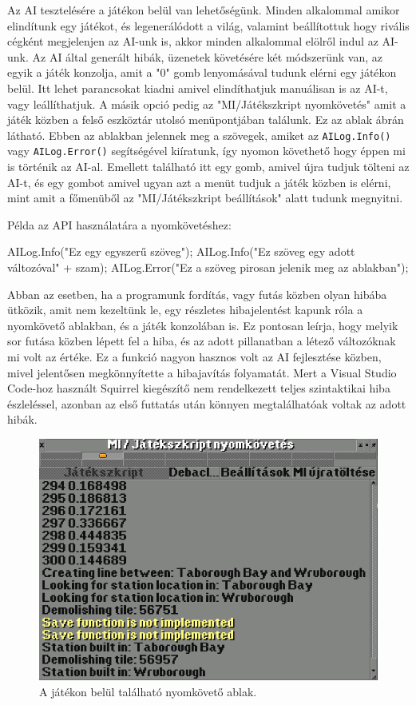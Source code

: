 Az AI tesztelésére a játékon belül van lehetőségünk. Minden alkalommal amikor elindítunk egy játékot, és legenerálódott a világ, valamint beállítottuk hogy rivális cégként megjelenjen az AI-unk is, akkor minden alkalommal elölről indul az AI-unk. Az AI által generált hibák, üzenetek követésére két módszerünk van, az egyik a játék konzolja, amit a "0" gomb lenyomásával tudunk elérni egy játékon belül. Itt lehet parancsokat kiadni amivel elindíthatjuk manuálisan is az AI-t, vagy leállíthatjuk. A másik opció pedig az "MI/Játékszkript nyomkövetés" amit a játék közben a felső eszköztár utolsó menüpontjában találunk. Ez az ablak  ábrán látható. Ebben az ablakban jelennek meg a szövegek, amiket az \texttt{AILog.Info()} vagy \texttt{AILog.Error()} segítségével kiíratunk, így nyomon követhető hogy éppen mi is történik az AI-al. Emellett található itt egy gomb, amivel újra tudjuk tölteni az AI-t, és egy gombot amivel ugyan azt a menüt tudjuk a játék közben is elérni, mint amit a főmenüből az "MI/Játékszkript beállítások" alatt tudunk megnyitni.

Példa az API használatára a nyomkövetéshez:
\begin{cpp}
AILog.Info("Ez egy egyszerű szöveg");
AILog.Info("Ez szöveg egy adott változóval" + szam);
AILog.Error("Ez a szöveg pirosan jelenik meg az ablakban");
\end{cpp}

Abban az esetben, ha a programunk fordítás, vagy futás közben olyan hibába ütközik, amit nem kezeltünk le, egy részletes hibajelentést kapunk róla a nyomkövető ablakban, és a játék konzolában is. Ez pontosan leírja, hogy melyik sor futása közben lépett fel a hiba, és az adott pillanatban a létező változóknak mi volt az értéke. Ez a funkció nagyon hasznos volt az AI fejlesztése közben, mivel jelentősen megkönnyítette a hibajavítás folyamatát. Mert a Visual Studio Code-hoz használt Squirrel kiegészítő nem rendelkezett teljes szintaktikai hiba észleléssel, azonban az első futtatás után könnyen megtalálhatóak voltak az adott hibák.

\begin{figure}
	\centering
	\includegraphics[scale=0.8]{images/console.png}
	\caption{A játékon belül található nyomkövető ablak.}
	\label{fig:console}
\end{figure}

